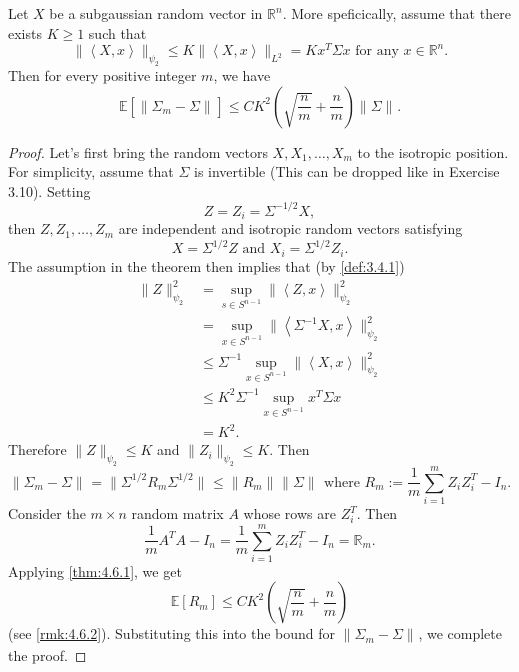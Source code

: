 \begin{theorem}
\label{thm:4.7.1}
Let $X$ be a subgaussian random vector in $\mathbb{R}^n$. More speficically, assume that there exists 
$K \geq 1$ such that 
\[ \lVert \left\langle X, x \right\rangle \rVert_{\psi_2} \leq 
K \lVert \left\langle X, x \right\rangle \rVert_{L^2} = K x^T \Sigma x \text{ for any } x \in \mathbb{R}^n. \]
Then for every positive integer $m$, we have 
\[ \mathbb{E}\left[ \lVert \Sigma_m - \Sigma \rVert_{} \right] 
\leq CK^2 \left( \sqrt{\frac{n}{m}} + \frac{n}{m} \right) \lVert \Sigma \rVert_{}. \]
\end{theorem}

\begin{proof}
Let's first bring the random vectors $X, X_1, \dots, X_m$ to the isotropic position. For simplicity, assume 
that $\Sigma$ is invertible (This can be dropped like in Exercise 3.10). Setting 
\[ Z = Z_i = \Sigma^{-1/2}X, \]
then $Z, Z_1, \dots, Z_m$ are independent and isotropic random vectors satisfying 
\[ X = \Sigma^{1/2}Z \text{ and } X_i = \Sigma^{1/2} Z_i. \]
The assumption in the theorem then implies that (by \cref{def:3.4.1})
\begin{align*}
	\lVert Z \rVert_{\psi_2}^2 
	&= \sup_{s \in S^{n - 1}} \lVert \left\langle Z, x \right\rangle \rVert_{\psi_2}^2 \\
	&= \sup_{x \in S^{n - 1}} \lVert \left\langle \Sigma^{-1}X, x \right\rangle \rVert_{\psi_2}^2 \\
	&\leq \Sigma^{-1} \sup_{x \in S^{n - 1}} \lVert \left\langle X, x \right\rangle \rVert_{\psi_2}^2 \\
	&\leq K^2 \Sigma^{-1} \sup_{x \in S^{n - 1}} x^T \Sigma x \\
	&= K^2.
\end{align*}
Therefore $\lVert Z \rVert_{\psi_2} \leq K$ and $\lVert Z_i \rVert_{\psi_2} \leq K$. Then 
\[ \lVert \Sigma_m - \Sigma \rVert_{} = \lVert \Sigma^{1/2}R_m \Sigma^{1/2} \rVert_{} 
\leq \lVert R_m \rVert_{} \lVert \Sigma \rVert_{} \text{ where } 
R_m := \frac{1}{m}\sum_{i = 1}^{m}Z_iZ_i^T - I_n. \]
Consider the $m \times n$ random matrix $A$ whose rows are $Z_i^T$. Then 
\[ \frac{1}{m}A^T A - I_n = \frac{1}{m}\sum_{i = 1}^{m}Z_iZ_i^T - I_n = \mathbb{R}_m. \]
Applying \cref{thm:4.6.1}, we get 
\[ \mathbb{E}\left[ R_m \right] \leq CK^2 \left( \sqrt{\frac{n}{m}} + \frac{n}{m} \right) \]
(see \cref{rmk:4.6.2}). Substituting this into the bound for $\lVert \Sigma_m - \Sigma \rVert_{}$, we complete 
the proof.
\end{proof}

